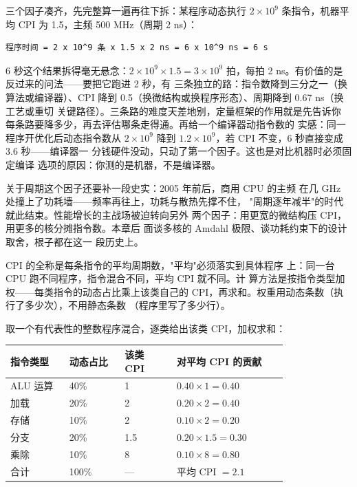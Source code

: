 三个因子凑齐，先完整算一遍再往下拆：某程序动态执行
$2\times10^9$ 条指令，机器平均 CPI 为 1.5，主频 500 MHz（周期
2 ns）：

\begin{lstlisting}
程序时间 = 2 x 10^9 条 x 1.5 x 2 ns = 6 x 10^9 ns = 6 s
\end{lstlisting}

6 秒这个结果拆得毫无悬念：$2\times10^9\times1.5=3\times10^9$
拍，每拍 2 ns。有价值的是反过来的问法——要把它跑进 2 秒，有
三条独立的路：指令数降到三分之一（换算法或编译器）、CPI 降到
0.5（换微结构或换程序形态）、周期降到 0.67 ns（换工艺或重切
关键路径）。三条路的难度天差地别，定量框架的作用就是先告诉你
每条路要降多少，再去评估哪条走得通。再给一个编译器动指令数的
实感：同一程序开优化后动态指令数从 $2\times10^9$ 降到
$1.2\times10^9$，若 CPI 不变，6 秒直接变成 3.6 秒——编译器一
分钱硬件没动，只动了第一个因子。这也是对比机器时必须固定编译
选项的原因：你测的是机器，不是编译器。

关于周期这个因子还要补一段史实：2005 年前后，商用 CPU 的主频
在几 GHz 处撞上了功耗墙——频率再往上，功耗与散热先撑不住，
"周期逐年减半"的时代就此结束。性能增长的主战场被迫转向另外
两个因子：用更宽的微结构压 CPI，用更多的核分摊指令数。本章后
面谈多核的 Amdahl 极限、谈功耗约束下的设计取舍，根子都在这一
段历史上。

CPI 的全称是每条指令的平均周期数，"平均"必须落实到具体程序
上：同一台 CPU 跑不同程序，指令混合不同，平均 CPI 就不同。计
算方法是按指令类型加权——每类指令的动态占比乘上该类自己的
CPI，再求和。权重用动态条数（执行了多少次），不用静态条数
（程序里写了多少行）。

取一个有代表性的整数程序混合，逐类给出该类 CPI，加权求和：

\begin{longtable}{L{0.17\linewidth}L{0.16\linewidth}L{0.15\linewidth}L{0.32\linewidth}}
\toprule
指令类型 & 动态占比 & 该类 CPI & 对平均 CPI 的贡献 \\
\midrule
ALU 运算 & 40\% & 1 & $0.40\times1=0.40$ \\
加载 & 20\% & 2 & $0.20\times2=0.40$ \\
存储 & 10\% & 2 & $0.10\times2=0.20$ \\
分支 & 20\% & 1.5 & $0.20\times1.5=0.30$ \\
乘除 & 10\% & 8 & $0.10\times8=0.80$ \\
\midrule
合计 & 100\% & --- & 平均 CPI $=2.1$ \\
\bottomrule
\end{longtable}

